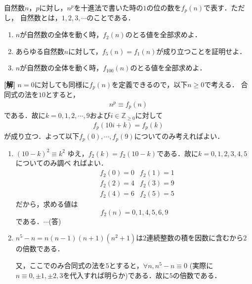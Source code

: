 \documentclass[a4j]{jarticle}
\begin{document}

     \begin{oframed}
     自然数$n$，$p$に対し，$n^p$を十進法で書いた時の$1$の位の数を$f_p(n)$で表す．ただし，
     自然数とは，$1,2,3,\cdots$のことである．
          \begin{enumerate}[(1)]
          \item $n$が自然数の全体を動く時，$f_2(n)$のとる値を全部求めよ．
          \item あらゆる自然数$n$に対して，$f_5(n)=f_1(n)$が成り立つことを証明せよ．
          \item $n$が自然数の全体を動く時，$f_{100}(n)$のとる値を全部求めよ．
          \end{enumerate}
     \end{oframed}

\setlength{\columnseprule}{0.4pt}
\begin{multicols}{2}
{\bf[解]} $n=0$に対しても同様に$f_p(n)$を定義できるので，以下$n\ge0$で考える．
合同式の法を$10$とすると，
     \begin{align*}
     n^p\equiv f_p(n)
     \end{align*}
である．故に$k=0,1,2,\cdots,9$および$i\in\mathbb{Z}_{\ge0}$に対して
     \begin{align*}
     f_p(10i+k)=f_p(k)
     \end{align*}
が成り立つ．よって以下$f_p(0),\cdots,f_p(9)$についてのみ考えればよい．
     \begin{enumerate}[(1)]
     \item $(10-k)^2\equiv k^2$ ゆえ，$f_2(k)=f_2(10-k)$である．故に$k=0,1,2,3,4,5$についてのみ調べ
     ればよい．
          \begin{align*}
          &f_2(0)=0 &f_2(1)=1 \\
          &f_2(2)=4 &f_2(3)=9  \\
          &f_2(4)=6 & f_2(5)=5
          \end{align*}
     だから，求める値は
           \[f_2(n)=0,1,4,5,6,9\]
     である．$\cdots$(答)
     
     \item $n^5-n=n(n-1)(n+1)(n^2+1)$は$2$連続整数の積を因数に含むから$2$の倍数である．
     
     又，ここでのみ合同式の法を$5$とすると，$\forall n,n^5-n\equiv0$
     (実際に$n\equiv0,\pm1,\pm2,3$を代入すれば明らか)である．故に$5$の倍数である．
     

\end{enumerate}
\end{multicols}
\end{document}

